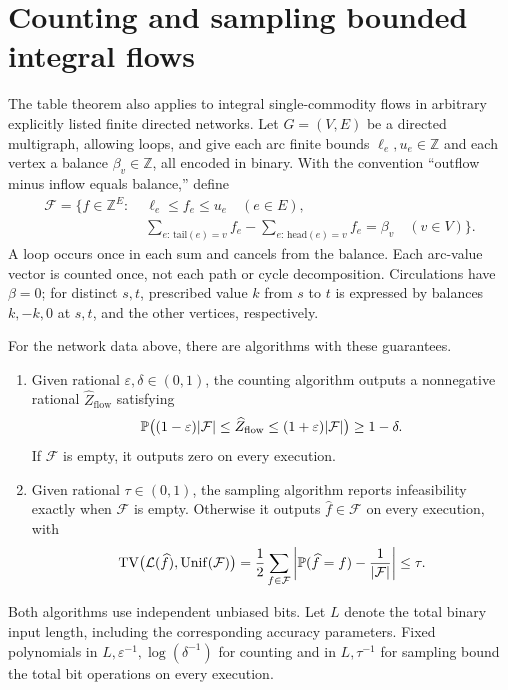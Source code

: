 \section{Counting and sampling bounded integral flows}\label{sec:flows}

The table theorem also applies to integral single-commodity flows in
arbitrary explicitly listed finite directed networks. Let $G=(V,E)$ be
a directed multigraph, allowing loops, and give each arc finite bounds
$\ell_e,u_e\in\mathbb Z$ and each vertex a balance $\beta_v\in\mathbb Z$,
all encoded in binary. With the convention ``outflow minus inflow equals
balance,'' define
\begin{equation}\label{eq:flow-set}
\begin{aligned}
\mathcal F=\bigl\{f\in\mathbb Z^E:\;&
 \ell_e\le f_e\le u_e\quad(e\in E),\\
 &
 \sum_{e:\,\mathrm{tail}(e)=v}f_e-
 \sum_{e:\,\mathrm{head}(e)=v}f_e=\beta_v\quad(v\in V)\bigr\}.
\end{aligned}
\end{equation}
A loop occurs once in each sum and cancels from the balance. Each
arc-value vector is counted once, not each path or cycle decomposition.
Circulations have $\beta=0$; for distinct $s,t$, prescribed value $k$
from $s$ to $t$ is expressed by balances $k,-k,0$ at $s,t$, and the
other vertices, respectively.

\begin{corollary}\label{cor:integral-flows}
For the network data above, there are algorithms with these guarantees.
\begin{enumerate}[label=(\roman*)]
\item Given rational $\varepsilon,\delta\in(0,1)$, the counting algorithm
outputs a nonnegative rational $\widehat Z_{\mathrm{flow}}$ satisfying
\[
 \P\bigl((1-\varepsilon)|\mathcal F|\le\widehat Z_{\mathrm{flow}}
             \le(1+\varepsilon)|\mathcal F|\bigr)\ge1-\delta.
\]
If $\mathcal F$ is empty, it outputs zero on every execution.
\item Given rational $\tau\in(0,1)$, the sampling algorithm reports
infeasibility exactly when $\mathcal F$ is empty. Otherwise it outputs
$\widehat f\in\mathcal F$ on every execution, with
\[
 \TV\bigl(\mathcal L(\widehat f),\operatorname{Unif}(\mathcal F)\bigr)
 =\frac12\sum_{f\in\mathcal F}
   \left|\P(\widehat f=f)-\frac1{|\mathcal F|}\right|\le\tau.
\]
\end{enumerate}
Both algorithms use independent unbiased bits. Let $L$ denote the total
binary input length, including the corresponding accuracy parameters.
Fixed polynomials in $L,\varepsilon^{-1},\log(\delta^{-1})$ for counting
and in $L,\tau^{-1}$ for sampling bound the total bit operations on
every execution.
\end{corollary}

